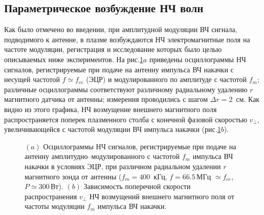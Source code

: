 \documentclass[autoref,10pt]{disser}
\begin{document}
\subsection{Параметрическое возбуждение НЧ волн}
Как было отмечено во введении, при амплитудной модуляции ВЧ сигнала, подводимого к антенне, в плазме возбуждаются НЧ электромагнитные поля на частоте модуляции, регистрация и исследование которых было целью описываемых ниже экспериментов.
На \mbox{рис.\ref{fig:phase_composite}$a$} приведены  осциллограммы НЧ сигналов, регистрируемые при подаче на антенну импульса ВЧ накачки с несущей частотой $f\simeq{}f_{ce}$ (ЭЦР) и модулированного по амплитуде с частотой $f_{m}$; различные осциллограммы соответствуют различному радиальному удалению $r$ магнитного датчика от антенны; измерения проводились с шагом $\Delta{}r = 2$~см. Как видно из этого графика, НЧ возмущение внешнего магнитного поля распространяется поперек плазменного столба с конечной фазовой скоростью $v_{\perp}$, увеличивающейся с частотой модуляции ВЧ импульса накачки (\mbox{рис.\ref{fig:phase_composite}$b$}).
\begin{figure}[H]
        \centering
        \def\svgwidth{0.7\columnwidth} %
        
        \caption{$(a)$ Осциллограммы НЧ сигналов, регистрируемые при подаче на антенну амплитудно--модулированного с частотой $f_{m}$ импульса ВЧ накачки в условиях ЭЦР, при различном радиальном удалении $r$ магнитного зонда от антенны ($f_{m} = 400$\, кГц, $f=66.5$\,МГц $\simeq f_{ce}$, $P\simeq 300$\,Вт). $(b)$ Зависимость поперечной скорости распространения $v_{\perp}$ НЧ возмущений внешнего магнитного поля от частоты модуляции $f_{m}$ импульса ВЧ накачки.}
        \label{fig:phase_composite}
\end{figure} 



\end{document}
